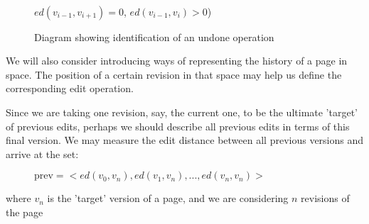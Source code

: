 \documentclass[a4paper,11pt,twoside,notitlepage]{article}
\begin{document}
        \begin{figure}[h!]
          \centering
          \\$ed(v_{i-1},v_{i+1}) = 0$, $ed(v_{i-1},v_{i}) > 0$)
          \caption{Diagram showing identification of an undone operation}
          \label{fig:undo}
        \end{figure}

        We will also consider introducing ways of representing the
        history of a page in space. The position of a certain revision
        in that space may help us define the corresponding edit operation.

        Since we are taking one revision, say, the current one, to be
        the ultimate 'target' of previous edits, perhaps we should
        describe all previous edits in terms of this final version. We
        may measure the edit distance between all previous versions
        and arrive at the set:
        
        \begin{figure}[h!]
          \centering
          $\text{prev} = <ed(v_0,v_n),ed(v_1,v_n),...,ed(v_n,v_n)>$  
        \end{figure}
        where $v_n$ is the 'target' version of a page, and we are
        considering $n$ revisions of the page

        
\end{document}
